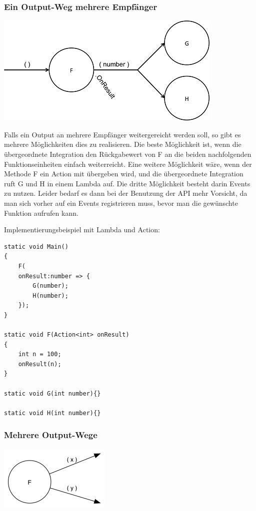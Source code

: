 \subsubsection{Ein Output-Weg mehrere Empfänger}

\begin{center}
\includegraphics[width=.7\linewidth]{./img/diagramOut1to2.png}
\end{center}


Falls ein Output an mehrere Empfänger weitergereicht werden soll, so gibt es
mehrere Möglichkeiten dies zu realisieren.
Die beste Möglichkeit ist, wenn die übergeordnete Integration den Rückgabewert
von F an die beiden nachfolgenden Funktionseinheiten einfach weiterreicht.
Eine weitere Möglichkeit wäre, wenn der Methode F ein Action mit übergeben wird,
und die übergeordnete Integration ruft G und H in einem Lambda auf.
Die dritte Möglichkeit besteht darin Events zu nutzen.
Leider bedarf es dann bei der Benutzung der API mehr Vorsicht, da man sich vorher auf ein Events registrieren muss, bevor man
die gewünschte Funktion aufrufen kann.

Implementierungsbeispiel mit Lambda und Action:
\begin{lstlisting}
static void Main()
{ 
    F(
    onResult:number => {
        G(number);
        H(number);
    });
}

static void F(Action<int> onResult)
{
    int n = 100;
    onResult(n);
}

static void G(int number){}

static void H(int number){}
\end{lstlisting}




\subsubsection{Mehrere Output-Wege}

\begin{center}
\includegraphics[width=.5\linewidth]{./img/diagramOut2.png}
\end{center}


